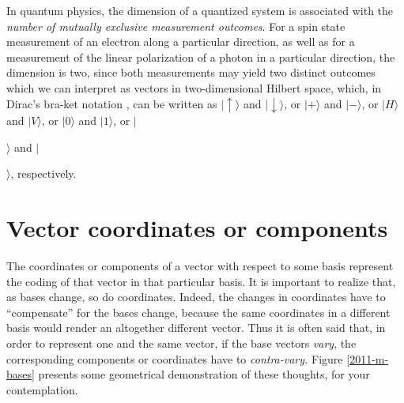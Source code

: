 {\color{Purple}
In quantum physics, the dimension of a quantized system is associated with
the {\em number of mutually exclusive measurement outcomes}.
For a spin state measurement of an electron
along a particular direction,
as well as for a measurement of the linear polarization
of a photon in a particular direction,
the dimension is two, since both measurements
may yield two distinct outcomes
which we can
interpret as vectors in two-dimensional Hilbert space,
which, in Dirac's bra-ket notation \cite{dirac}, can be written as
$
\mid \uparrow \rangle$ and $\mid \downarrow \rangle$,
or $\mid + \rangle$ and $
\mid - \rangle
$,
or
$
\mid H \rangle $ and $
\mid V \rangle
$,
or
$
\mid 0 \rangle $ and $
\mid 1 \rangle
$,
or
$
\mid$$\rangle $ and $
\mid$$\rangle
$,
respectively.
}

\section{Vector coordinates or components}
The coordinates or components of a vector with respect to some basis
represent the coding of that vector in that particular basis.
It is important to realize that, as bases change, so do coordinates.
Indeed, the changes in coordinates have to ``compensate'' for the bases change,
because the same coordinates in a different basis would render an altogether different
vector.
Thus it is often said that, in order to represent one and the same vector,
if the base vectors {\em vary}, the corresponding components or coordinates have to {\em contra-vary.}
Figure \ref{2011-m-bases} presents some geometrical demonstration of
these thoughts, for your contemplation.

